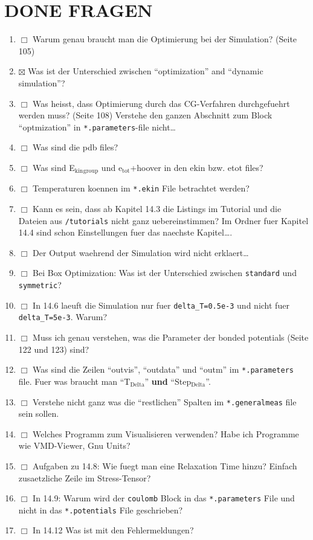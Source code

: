 \documentclass[11pt]{article}
\begin{document}
\section{\textbf{DONE} FRAGEN}
\label{sec-3}


\begin{enumerate}
\item $\Box$ Warum genau braucht man die Optimierung bei der Simulation? (Seite 105)
\item $\boxtimes$ Was ist der Unterschied zwischen ``optimization'' and ``dynamic simulation''?
\item $\Box$ Was heisst, dass Optimierung durch das CG-Verfahren durchgefuehrt werden muss? (Seite 108) Verstehe den ganzen Abschnitt zum Block ``optmization'' in \texttt{*.parameters}-file nicht\ldots{}
\item $\Box$ Was sind die pdb files?
\item $\Box$ Was sind E$_{\mathrm{kin}}$$_{\mathrm{group}}$ und e$_{\mathrm{tot}}$+hoover in den ekin bzw. etot files?
\item $\Box$ Temperaturen koennen im \texttt{*.ekin} File betrachtet werden?
\item $\Box$ Kann es sein, dass ab Kapitel 14.3 die Listings im Tutorial und die Dateien aus \texttt{/tutorials} nicht ganz uebereinstimmen? Im Ordner fuer Kapitel 14.4 sind schon Einstellungen fuer das naechste Kapitel\ldots{}.
\item $\Box$ Der Output waehrend der Simulation wird nicht erklaert\ldots{}
\item $\Box$ Bei Box Optimization: Was ist der Unterschied zwischen \texttt{standard} und \texttt{symmetric}?
\item $\Box$ In 14.6 laeuft die Simulation nur fuer \texttt{delta\_T=0.5e-3} und nicht fuer \texttt{delta\_T=5e-3}. Warum?
\item $\Box$ Muss ich genau verstehen, was die Parameter der bonded potentials (Seite 122 und 123) sind?
\item $\Box$ Was sind die Zeilen ``outvis'', ``outdata'' und ``outm'' im \texttt{*.parameters} file. Fuer was braucht man ``T$_{\mathrm{Delta}}$'' \textbf{und} ``Step$_{\mathrm{Delta}}$''.
\item $\Box$ Verstehe nicht ganz was die ``restlichen'' Spalten im \texttt{*.generalmeas} file sein sollen.
\item $\Box$ Welches Programm zum Visualisieren verwenden? Habe ich Programme wie VMD-Viewer, Gnu Units?
\item $\Box$ Aufgaben zu 14.8: Wie fuegt man eine Relaxation Time hinzu? Einfach zusaetzliche Zeile im Stress-Tensor?
\item $\Box$ In 14.9: Warum wird der \texttt{coulomb} Block in das \texttt{*.parameters} File und nicht in das \texttt{*.potentials} File geschrieben?
\item $\Box$ In 14.12 Was ist mit den Fehlermeldungen?
\end{enumerate}
\end{document}
